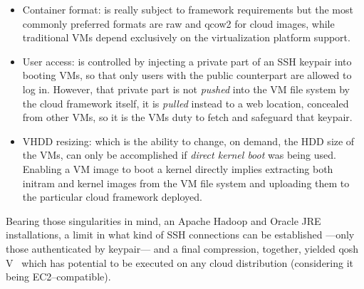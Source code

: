 \documentclass[conference]{IEEEtran}
\begin{document}
\begin{itemize}
 \item Container format: is really subject to framework requirements but the most commonly preferred formats are raw and qcow2 for cloud images, while traditional VMs depend exclusively on the virtualization platform support.
 
 \item User access: is controlled by injecting a private part of an SSH keypair into booting VMs, so that only users with the public counterpart are allowed to log in. However, that private part is not \emph{pushed} into the VM file system by the cloud framework itself, it is \emph{pulled} instead to a web location, concealed from other VMs, so it is the VMs duty to fetch and safeguard that keypair.
 
 \item VHDD resizing: which is the ability to change, on demand, the HDD size of the VMs, can only be accomplished if \emph{direct kernel boot} was being used. Enabling a VM image to boot a kernel directly implies extracting both initram and kernel images from the VM file system and uploading them to the particular cloud framework deployed.
\end{itemize}

Bearing those singularities in mind, an Apache Hadoop and Oracle JRE installations, a limit in what kind of SSH connections can be established ---only those authenticated by keypair--- and a final compression, together, yielded qosh V~\cite{ahvm:2013:online} which has potential to be executed on any cloud distribution (considering it being EC2--compatible).

\end{document}

